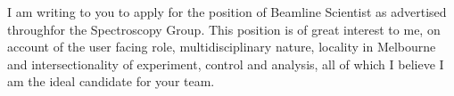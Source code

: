 \documentclass[10pt,a4paper,ragged2e,withhyper,paragraphstrue]{altacv}
\newcommand{\pind}{\hspace{24pt}}
\begin{document}



	\pind I am writing to you to apply for the position of Beamline Scientist as advertised throughfor the Spectroscopy Group. This position is of great interest to me, on account of the user facing role, multidisciplinary nature, locality in Melbourne and intersectionality of experiment, control and analysis, all of which I believe I am the ideal candidate for your team. 
\end{document}

